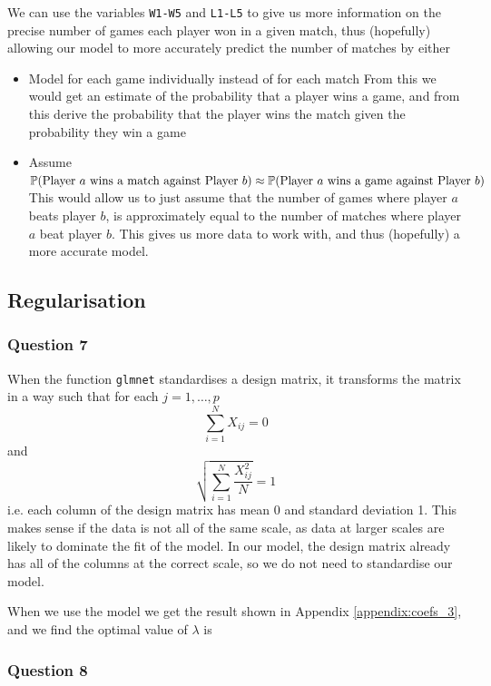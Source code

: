 \documentclass[11pt]{article} %
\let\originalleft\left
\let\originalright\right
\renewcommand{\left}{\mathopen{}\mathclose\bgroup\originalleft}
\renewcommand{\right}{\aftergroup\egroup\originalright}
\begin{document}
We can use the variables \verb|W1-W5| and \verb|L1-L5| to give us more information on the precise number of games each player won in a given match, thus (hopefully) allowing our model to more accurately predict the number of matches by either 
\begin{itemize}
	\item Model for each game individually instead of for each match
		\subitem From this we would get an estimate of the probability that a player wins a game, and from this derive the probability that the player wins the match given the probability they win a game
	\item Assume $\mathbb{P}\left(\text{Player }a\text{ wins a match against Player }b\right) \approx \mathbb{P}\left(\text{Player }a\text{ wins a game against Player }b\right)$
		\subitem This would allow us to just assume that the number of games where player $a$ beats player $b$, is approximately equal to the number of matches where player $a$ beat player $b$. This gives us more data to work with, and thus (hopefully) a more accurate model.
\end{itemize}

\subsection*{Regularisation}
\subsubsection*{Question 7}

When the function \verb|glmnet| standardises a design matrix, it transforms the matrix in a way such that for each $j = 1, \ldots, p$
$$ \sum_{i=1}^{N}{X_{ij}} = 0$$
and
$$ \sqrt{\sum_{i=1}^{N}{\frac{X_{ij}^2}{N}}} = 1$$
i.e. each column of the design matrix has mean 0 and standard deviation 1. This makes sense if the data is not all of the same scale, as data at larger scales are likely to dominate the fit of the model. In our model, the design matrix already has all of the columns at the correct scale, so we do not need to standardise our model.

When we use the model we get the result shown in Appendix \ref{appendix:coefs_3}, and we find the optimal value of $\lambda$ is


\subsubsection*{Question 8}
\end{document}
